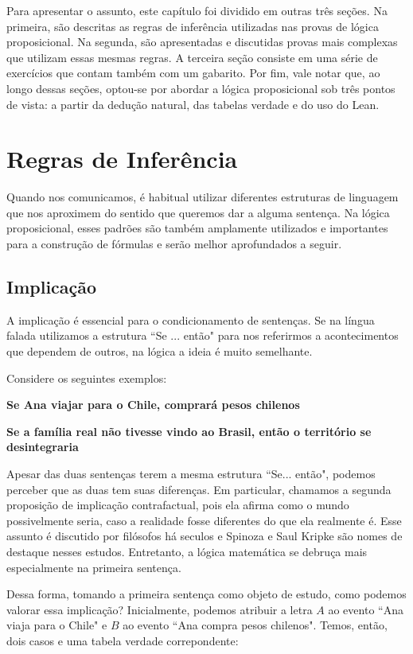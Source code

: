 Para apresentar o assunto, este capítulo foi dividido em outras três seções. Na primeira, são descritas as regras de inferência utilizadas nas provas de lógica proposicional. Na segunda, são apresentadas e discutidas provas mais complexas que utilizam essas mesmas regras. A terceira seção consiste em uma série de exercícios que contam também com um gabarito. Por fim, vale notar que, ao longo dessas seções, optou-se por abordar a lógica proposicional sob três pontos de vista: a partir da dedução natural, das tabelas verdade e do uso do Lean. 


\section{Regras de Inferência}
Quando nos comunicamos, é habitual utilizar diferentes estruturas de linguagem que nos aproximem do sentido que queremos dar a alguma sentença. Na lógica proposicional, esses padrões são também amplamente utilizados e importantes para a construção de fórmulas e serão melhor aprofundados a seguir.

\subsection{Implicação} 
A implicação é essencial para o condicionamento de sentenças. Se na língua falada utilizamos a estrutura ``Se ... então"  para nos referirmos a acontecimentos que dependem de outros, na lógica a ideia é muito semelhante.

Considere os seguintes exemplos:
\begin{center}
\textbf{Se Ana viajar para o Chile, comprará pesos chilenos}

\textbf{Se a família real não tivesse vindo ao Brasil, então o território se desintegraria}
\end{center}

Apesar das duas sentenças terem a mesma estrutura ``Se... então", podemos perceber que as duas tem suas diferenças. Em particular, chamamos a segunda proposição de implicação contrafactual, pois ela afirma como o mundo possivelmente seria, caso a realidade fosse diferentes do que ela realmente é. Esse assunto é discutido por filósofos há seculos e Spinoza e Saul Kripke são nomes de destaque nesses estudos. Entretanto, a lógica matemática se debruça mais especialmente na primeira sentença.

Dessa forma, tomando a primeira sentença como objeto de estudo, como podemos valorar essa implicação?
Inicialmente, podemos atribuir a letra $A$ ao evento ``Ana viaja para o Chile" e $B$ ao evento ``Ana compra pesos chilenos". Temos, então, dois casos e uma tabela verdade correpondente:

